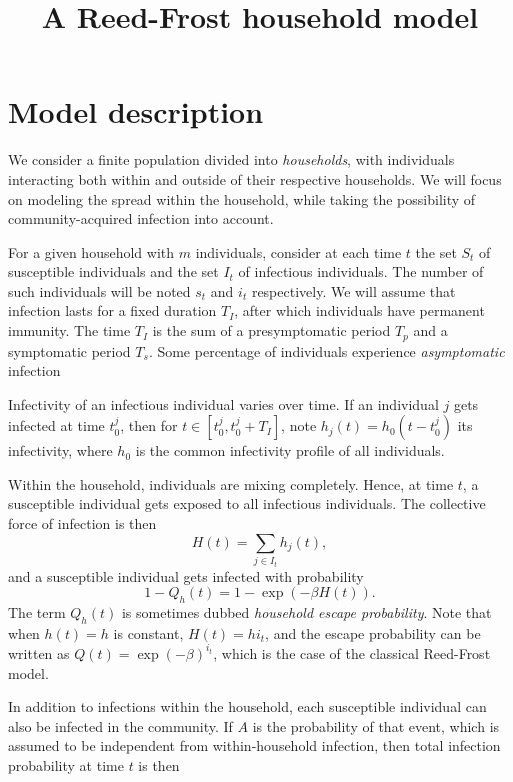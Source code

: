 \documentclass[a4paper]{article}
\title{A Reed-Frost household model}
\date{}
\begin{document}
\maketitle

\section*{Model description}

We consider a finite population divided into \emph{households}, with individuals
interacting both within and outside of their respective households. We will 
focus on modeling the spread within the household, while taking the possibility
of community-acquired infection into account. 

For a given household with \(m\) individuals, consider at each time \(t\) the
set \(S_t\) of susceptible individuals and the set \(I_t\) of infectious
individuals. The number of such individuals will be noted \(s_t\) and \(i_t\)
respectively. We will assume that infection lasts for a fixed duration \(T_I\),
after which individuals have permanent immunity. The time \(T_I\) is the sum of 
a presymptomatic period \(T_p\) and a symptomatic period \(T_s\). Some 
percentage of individuals experience \emph{asymptomatic} infection

Infectivity of an infectious individual varies over time. If an individual \(j\)
gets
infected at time \(t_0^j\), then for \(t\in [t_0^j,t_0^j+T_I]\), note \(h_j
(t)=h_0
(t-t_0^j)\) its
infectivity, where \(h_0\) is the common infectivity profile of all individuals.

Within the household, individuals are mixing completely. Hence, at time \(t\), a
susceptible individual gets exposed to all infectious individuals. The 
collective force of infection is then 
\begin{equation}
	H(t) = \sum_{j\in I_t} h_j(t),
\end{equation}
and a susceptible individual gets infected with probability
\begin{equation}
	1-Q_h(t) = 1- \exp(-\beta H(t)).
\end{equation}
The term \(Q_h(t)\) is sometimes dubbed \emph{household escape probability}. 
Note that when
\(h(t)=h\) is constant, \(H(t)=hi_t\), and the escape
probability can be written as \(Q(t) = \exp(-\beta)^{i_t}\), which is the case 
of the classical Reed-Frost model.

In addition to infections within the household, each susceptible individual can
also be infected in the community. If \(A\) is the probability of that event,
which is assumed to be independent from within-household infection, then total
infection probability at time \(t\) is then
\end{document}
